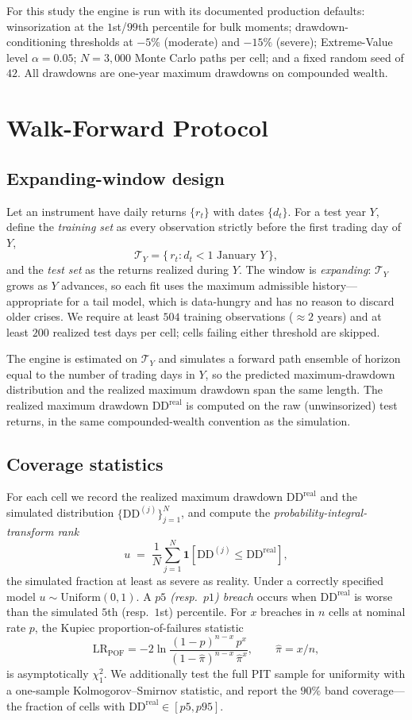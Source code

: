 \documentclass[11pt]{article}
\newcommand{\ind}{\mathbf{1}}
\newcommand{\dd}{\mathrm{DD}}
\begin{document}
\noindent
For this study the engine is run with its documented production defaults:
winsorization at the $1$st/$99$th percentile for bulk moments; drawdown-conditioning
thresholds at $-5\%$ (moderate) and $-15\%$ (severe); Extreme-Value level
$\alpha=0.05$; $N=3{,}000$ Monte Carlo paths per cell; and a fixed random seed of
$42$. All drawdowns are one-year maximum drawdowns on compounded wealth.

\section{Walk-Forward Protocol}

\subsection{Expanding-window design}
Let an instrument have daily returns $\{r_t\}$ with dates $\{d_t\}$. For a test
year $Y$, define the \emph{training set} as every observation strictly before the
first trading day of $Y$,
\[
  \mathcal{T}_Y = \{\, r_t : d_t < \text{$1$ January }Y \,\},
\]
and the \emph{test set} as the returns realized during $Y$. The window is
\emph{expanding}: $\mathcal{T}_Y$ grows as $Y$ advances, so each fit uses the
maximum admissible history---appropriate for a tail model, which is data-hungry
and has no reason to discard older crises. We require at least $504$ training
observations ($\approx 2$ years) and at least $200$ realized test days per cell;
cells failing either threshold are skipped.

The engine is estimated on $\mathcal{T}_Y$ and simulates a forward path ensemble
of horizon equal to the number of trading days in $Y$, so the predicted maximum-drawdown
distribution and the realized maximum drawdown span the same length. The realized
maximum drawdown $\dd^{\mathrm{real}}$ is computed on the raw (unwinsorized) test
returns, in the same compounded-wealth convention as the simulation.

\subsection{Coverage statistics}
For each cell we record the realized maximum drawdown $\dd^{\mathrm{real}}$ and the
simulated distribution $\{\dd^{(j)}\}_{j=1}^N$, and compute the
\emph{probability-integral-transform rank}
\[
  u \;=\; \frac1N \sum_{j=1}^{N} \ind\!\left[\dd^{(j)} \le \dd^{\mathrm{real}}\right],
\]
the simulated fraction at least as severe as reality. Under a correctly specified
model $u \sim \mathrm{Uniform}(0,1)$. A \emph{$p5$ (resp.\ $p1$) breach} occurs when
$\dd^{\mathrm{real}}$ is worse than the simulated $5$th (resp.\ $1$st) percentile.
For $x$ breaches in $n$ cells at nominal rate $p$, the Kupiec proportion-of-failures
statistic
\[
  \mathrm{LR}_{\mathrm{POF}}
  = -2\ln\frac{(1-p)^{n-x}\,p^{x}}{(1-\hat\pi)^{n-x}\,\hat\pi^{x}},
  \qquad \hat\pi = x/n,
\]
is asymptotically $\chi^2_1$. We additionally test the full PIT sample for
uniformity with a one-sample Kolmogorov--Smirnov statistic, and report the $90\%$
band coverage---the fraction of cells with $\dd^{\mathrm{real}} \in [p5, p95]$.
\end{document}
